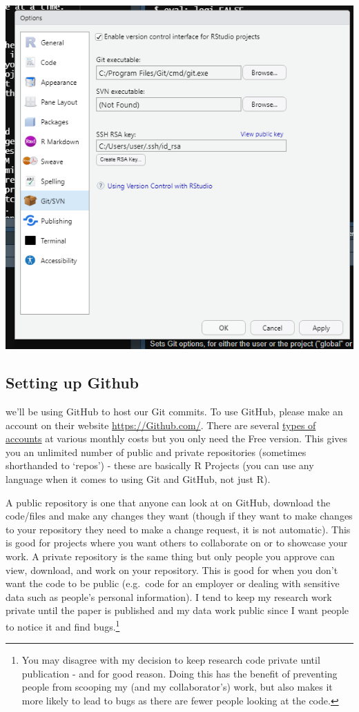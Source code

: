 \documentclass[
  12pt,
  openany]{book}
\begin{document}
\includegraphics{images/git_tools.PNG}

\hypertarget{setting-up-github}{%
\subsection{Setting up Github}\label{setting-up-github}}

we'll be using GitHub to host our Git commits. To use GitHub, please make an account on their website \url{https://Github.com/}. There are several \href{https://Github.com/pricing}{types of accounts} at various monthly costs but you only need the Free version. This gives you an unlimited number of public and private repositories (sometimes shorthanded to `repos') - these are basically R Projects (you can use any language when it comes to using Git and GitHub, not just R).

A public repository is one that anyone can look at on GitHub, download the code/files and make any changes they want (though if they want to make changes to your repository they need to make a change request, it is not automatic). This is good for projects where you want others to collaborate on or to showcase your work. A private repository is the same thing but only people you approve can view, download, and work on your repository. This is good for when you don't want the code to be public (e.g.~code for an employer or dealing with sensitive data such as people's personal information). I tend to keep my research work private until the paper is published and my data work public since I want people to notice it and find bugs.\footnote{You may disagree with my decision to keep research code private until publication - and for good reason. Doing this has the benefit of preventing people from scooping my (and my collaborator's) work, but also makes it more likely to lead to bugs as there are fewer people looking at the code.}
\end{document}
